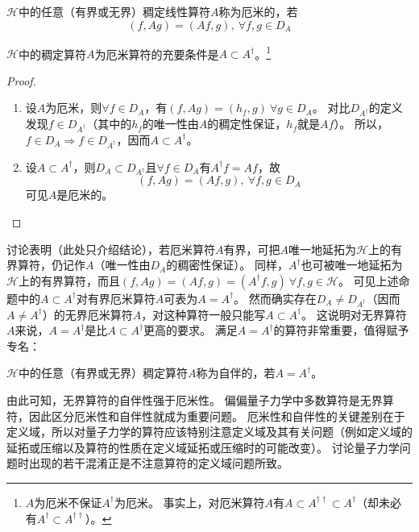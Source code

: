 \begin{definition}
    $\mathscr{H}$中的任意（有界或无界）稠定线性算符$A$称为厄米的，若
    $$(f, Ag) = (Af, g), ~ \forall f, g \in D_A$$
\end{definition}

\begin{theorem}
    $\mathscr{H}$中的稠定算符$A$为厄米算符的充要条件是$A \subset A^\dagger$。\footnote{
        $A$为厄米不保证$A^\dagger$为厄米。
        事实上，对厄米算符$A$有$A \subset A^{\dagger\dagger} \subset A^\dagger$（却未必有$A^\dagger \subset A^{\dagger\dagger}$）。
    }
\end{theorem}

\begin{proof}
    \begin{enumerate}[（A）]
        \item 设$A$为厄米，则$\forall f \in D_A$，有$(f, Ag) = (h_f, g) ~ \forall g \in D_A$。
        对比$D_{A^\dagger}$的定义发现$f \in D_{A^\dagger}$（其中的$h_f$的唯一性由$A$的稠定性保证，$h_f$就是$Af$）。
        所以，$f \in D_A \Rightarrow f \in D_{A^\dagger}$，因而$A \subset A^\dagger$。
        \item 设$A \subset A^\dagger$，则$D_A \subset D_{A^\dagger}$且$\forall f \in D_A$有$A^\dagger f = Af$，故
        $$(f, Ag) = (Af, g), ~ \forall f, g \in D_A$$
        可见$A$是厄米的。
    \end{enumerate}
\end{proof}

\begin{note}
    讨论表明（此处只介绍结论），若厄米算符$A$有界，可把$A$唯一地延拓为$\mathscr{H}$上的有界算符，仍记作$A$（唯一性由$D_A$的稠密性保证）。
    同样，$A^\dagger$也可被唯一地延拓为$\mathscr{H}$上的有界算符，而且$(f, Ag) = (Af, g) = (A^\dagger f, g) ~ \forall f, g \in \mathscr{H}$。
    可见上述命题中的$A \subset A^\dagger$对有界厄米算符$A$可表为$A = A^\dagger$。
    然而确实存在$D_A \neq D_{A^\dagger}$（因而$A \neq A^\dagger$）的无界厄米算符$A$，对这种算符一般只能写$A \subset A^\dagger$。
    这说明对无界算符$A$来说，$A = A^\dagger$是比$A \subset A^\dagger$更高的要求。
    满足$A = A^\dagger$的算符非常重要，值得赋予专名：
\end{note}

\begin{definition}
    $\mathscr{H}$中的任意（有界或无界）稠定算符$A$称为自伴的，若$A = A^\dagger$。
\end{definition}

由此可知，无界算符的自伴性强于厄米性。
偏偏量子力学中多数算符是无界算符，因此区分厄米性和自伴性就成为重要问题。
厄米性和自伴性的关键差别在于定义域，所以对量子力学的算符应该特别注意定义域及其有关问题（例如定义域的延拓或压缩以及算符的性质在定义域延拓或压缩时的可能改变）。
讨论量子力学问题时出现的若干混淆正是不注意算符的定义域问题所致。

